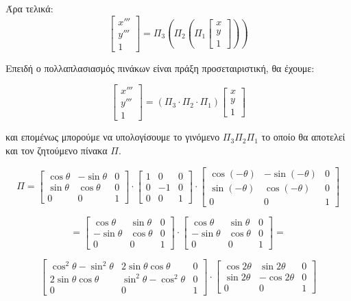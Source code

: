 Άρα τελικά:
\[
\begin{bmatrix}
x''' \\ y''' \\ 1
\end{bmatrix}
=
\Pi_3 (\Pi_2 (\Pi_1
\begin{bmatrix}
x \\ y \\ 1
\end{bmatrix}))
\]

Επειδή ο πολλαπλασιασμός πινάκων είναι πράξη προσεταιριστική, θα έχουμε:

\[
\begin{bmatrix}
x''' \\ y''' \\ 1
\end{bmatrix}
=
(\Pi_3 \cdot \Pi_2 \cdot \Pi_1)
\begin{bmatrix}
x \\ y \\ 1
\end{bmatrix}
\]

και επομένως μπορούμε να υπολογίσουμε το γινόμενο $\Pi_3 \Pi_2 \Pi_1$ το οποίο θα αποτελεί και τον ζητούμενο πίνακα $\Pi$.

\[
\Pi =
\begin{bmatrix}
\cos \theta & -\sin \theta & 0 \\
\sin \theta & \cos \theta & 0 \\
0 & 0 & 1
\end{bmatrix}
\cdot
\begin{bmatrix}
1 & 0 & 0 \\
0 & -1 & 0 \\
0 & 0 & 1
\end{bmatrix}
\cdot
\begin{bmatrix}
\cos(-\theta) & -\sin(-\theta) & 0 \\
\sin(-\theta) & \cos(-\theta) & 0 \\
0 & 0 & 1
\end{bmatrix}
\]

\[
=
\begin{bmatrix}
\cos \theta & \sin \theta & 0 \\
-\sin \theta & \cos \theta & 0 \\
0 & 0 & 1
\end{bmatrix}
\cdot
\begin{bmatrix}
\cos \theta & \sin \theta & 0 \\
-\sin \theta & \cos \theta & 0 \\
0 & 0 & 1
\end{bmatrix}
=
\]

\[
\begin{bmatrix}
\cos^2\theta - \sin^2\theta & 2\sin\theta\cos\theta & 0 \\
2\sin\theta\cos\theta & \sin^2\theta - \cos^2\theta & 0 \\
0 & 0 & 1
\end{bmatrix}
\cdot
\begin{bmatrix}
\cos 2\theta & \sin 2\theta & 0 \\
\sin 2\theta & -\cos 2\theta & 0 \\
0 & 0 & 1
\end{bmatrix}
\]